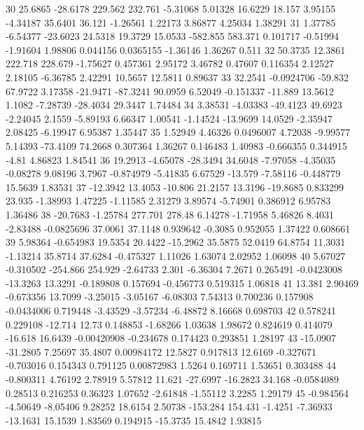 30  25.6865  -28.6178  229.562  232.761  -5.31068  5.01328  16.6229  18.157  3.95155  -4.34187  35.6401  36.121  -1.26561  1.22173  3.86877  4.25034  1.38291
31  1.37785  -6.54377  -23.6023  24.5318  19.3729  15.0533  -582.855  583.371  0.101717  -0.51994  -1.91604  1.98806  0.044156  0.0365155  -1.36146  1.36267  0.511
32  50.3735  12.3861  222.718  228.679  -1.75627  0.457361  2.95172  3.46782  0.47607  0.116354  2.12527  2.18105  -6.36785  2.42291  10.5657  12.5811  0.89637
33  32.2541  -0.0924706  -59.832  67.9722  3.17358  -21.9471  -87.3241  90.0959  6.52049  -0.151337  -11.889  13.5612  1.1082  -7.28739  -28.4034  29.3447  1.74484
34  3.38531  -4.03383  -49.4123  49.6923  -2.24045  2.1559  -5.89193  6.66347  1.00541  -1.14524  -13.9699  14.0529  -2.35947  2.08425  -6.19947  6.95387  1.35447
35  1.52949  4.46326  0.0496007  4.72038  -9.99577  5.14393  -73.4109  74.2668  0.307364  1.36267  0.146483  1.40983  -0.666355  0.344915  -4.81  4.86823  1.84541
36  19.2913  -4.65078  -28.3494  34.6048  -7.97058  -4.35035  -0.08278  9.08196  3.7967  -0.874979  -5.41835  6.67529  -13.579  -7.58116  -0.448779  15.5639  1.83531
37  -12.3942  13.4053  -10.806  21.2157  13.3196  -19.8685  0.833299  23.935  -1.38993  1.47225  -1.11585  2.31279  3.89574  -5.74901  0.386912  6.95783  1.36486
38  -20.7683  -1.25784  277.701  278.48  6.14278  -1.71958  5.46826  8.4031  -2.83488  -0.0825696  37.0061  37.1148  0.939642  -0.3085  0.952055  1.37422  0.608661
39  5.98364  -0.654983  19.5354  20.4422  -15.2962  35.5875  52.0419  64.8754  11.3031  -1.13214  35.8714  37.6284  -0.475327  1.11026  1.63074  2.02952  1.06098
40  5.67027  -0.310502  -254.866  254.929  -2.64733  2.301  -6.36304  7.2671  0.265491  -0.0423008  -13.3263  13.3291  -0.189808  0.157694  -0.456773  0.519315  1.06818
41  13.381  2.90469  -0.673356  13.7099  -3.25015  -3.05167  -6.08303  7.54313  0.700236  0.157908  -0.0434006  0.719448  -3.43529  -3.57234  -6.48872  8.16668  0.698703
42  0.578241  0.229108  -12.714  12.73  0.148853  -1.68266  1.03638  1.98672  0.824619  0.414079  -16.618  16.6439  -0.00420908  -0.234678  0.174423  0.293851  1.28197
43  -15.0907  -31.2805  7.25697  35.4807  0.00984172  12.5827  0.917813  12.6169  -0.327671  -0.703016  0.154343  0.791125  0.00872983  1.5264  0.169711  1.53651  0.303488
44  -0.800311  4.76192  2.78919  5.57812  11.621  -27.6997  -16.2823  34.168  -0.0584089  0.28513  0.216253  0.36323  1.07652  -2.61848  -1.55112  3.2285  1.29179
45  -0.984564  -4.50649  -8.05406  9.28252  18.6154  2.50738  -153.284  154.431  -1.4251  -7.36933  -13.1631  15.1539  1.83569  0.194915  -15.3735  15.4842  1.93815
